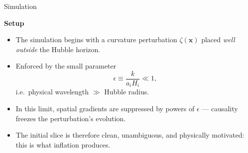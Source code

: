 \documentclass[aspectratio=169, 12pt]{beamer}
\begin{document}
\begin{frame}{Simulation}
	\begin{center}
		{\large\bfseries Setup\par}
	\end{center}
	\vspace{0.5em}
	\begin{itemize}
		\item The simulation begins with a curvature perturbation
		      $\zeta(\mathbf{x})$ placed \emph{well outside} the
		      Hubble horizon.
		\item Enforced by the small parameter
		      \[
		          \epsilon \equiv \frac{k}{a_i H_i} \ll 1,
		      \]
		      i.e.\ physical wavelength $\gg$ Hubble radius.
		\item In this limit, spatial gradients are suppressed by
		      powers of $\epsilon$ — causality freezes the
		      perturbation's evolution.
		\item The initial slice is therefore clean, unambiguous,
		      and physically motivated: this is what inflation
		      produces.
	\end{itemize}
\end{frame}
\end{document}
